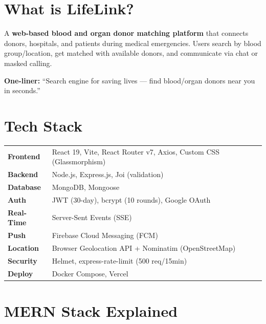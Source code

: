 \documentclass[10pt,a4paper]{article}
\begin{document}
\section{What is LifeLink?}

A \textbf{web-based blood and organ donor matching platform} that connects donors, hospitals, and patients during medical emergencies. Users search by blood group/location, get matched with available donors, and communicate via chat or masked calling.

\textbf{One-liner:} ``Search engine for saving lives --- find blood/organ donors near you in seconds.''

\section{Tech Stack}

\begin{tabularx}{\textwidth}{@{}lX@{}}
\textbf{Frontend} & React 19, Vite, React Router v7, Axios, Custom CSS (Glassmorphism) \\
\textbf{Backend} & Node.js, Express.js, Joi (validation) \\
\textbf{Database} & MongoDB, Mongoose \\
\textbf{Auth} & JWT (30-day), bcrypt (10 rounds), Google OAuth \\
\textbf{Real-Time} & Server-Sent Events (SSE) \\
\textbf{Push} & Firebase Cloud Messaging (FCM) \\
\textbf{Location} & Browser Geolocation API + Nominatim (OpenStreetMap) \\
\textbf{Security} & Helmet, express-rate-limit (500 req/15min) \\
\textbf{Deploy} & Docker Compose, Vercel \\
\end{tabularx}

\section{MERN Stack Explained}
\end{document}
